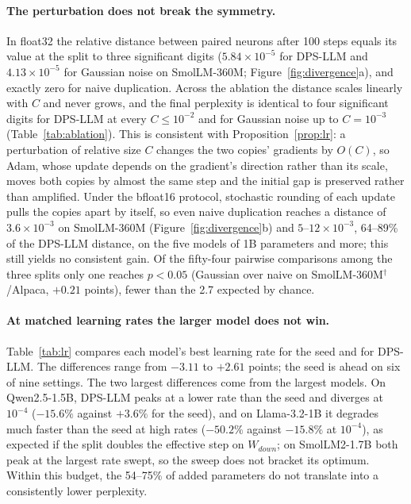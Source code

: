 \paragraph{The perturbation does not break the symmetry.}
In float32 the relative distance between paired neurons after 100 steps equals its value at the split to three significant digits ($5.84\times10^{-5}$ for DPS-LLM and $4.13\times10^{-5}$ for Gaussian noise on SmolLM-360M; Figure~\ref{fig:divergence}a), and exactly zero for naive duplication. Across the ablation the distance scales linearly with $C$ and never grows, and the final perplexity is identical to four significant digits for DPS-LLM at every $C\le10^{-2}$ and for Gaussian noise up to $C{=}10^{-3}$ (Table~\ref{tab:ablation}). This is consistent with Proposition~\ref{prop:lr}: a perturbation of relative size $C$ changes the two copies' gradients by $O(C)$, so Adam, whose update depends on the gradient's direction rather than its scale, moves both copies by almost the same step and the initial gap is preserved rather than amplified. Under the bfloat16 protocol, stochastic rounding of each update pulls the copies apart by itself, so even naive duplication reaches a distance of $3.6\times10^{-3}$ on SmolLM-360M (Figure~\ref{fig:divergence}b) and $5$--$12\times10^{-3}$, 64--89\% of the DPS-LLM distance, on the five models of 1B parameters and more; this still yields no consistent gain. Of the fifty-four pairwise comparisons among the three splits only one reaches $p<0.05$ (Gaussian over naive on SmolLM-360M$^\dagger$/Alpaca, $+0.21$ points), fewer than the 2.7 expected by chance.

\paragraph{At matched learning rates the larger model does not win.}
Table~\ref{tab:lr} compares each model's best learning rate for the seed and for DPS-LLM. The differences range from $-3.11$ to $+2.61$ points; the seed is ahead on six of nine settings. The two largest differences come from the largest models. On Qwen2.5-1.5B, DPS-LLM peaks at a lower rate than the seed and diverges at $10^{-4}$ ($-15.6\%$ against $+3.6\%$ for the seed), and on Llama-3.2-1B it degrades much faster than the seed at high rates ($-50.2\%$ against $-15.8\%$ at $10^{-4}$), as expected if the split doubles the effective step on $W_{down}$; on SmolLM2-1.7B both peak at the largest rate swept, so the sweep does not bracket its optimum. Within this budget, the 54--75\% of added parameters do not translate into a consistently lower perplexity.

